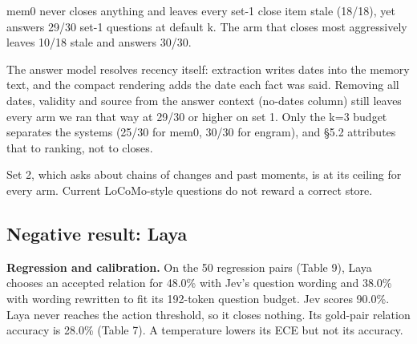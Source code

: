\documentclass[11pt]{article}
\newcommand{\src}[1]{}
\begin{document}
mem0 never closes anything and leaves every set-1 close item stale (18/18\src{bench/results/mem0__dev_updates.json}), yet answers 29/30\src{bench/results/mem0__dev_updates.json} set-1 questions at default k. The arm that closes most aggressively leaves 10/18\src{bench/results/e2_jev_v2__dev_updates__k3.json} stale and answers 30/30\src{bench/results/e2_jev_v2__dev_updates__k3.json}.

The answer model resolves recency itself: extraction writes dates into the memory text, and the compact rendering adds the date each fact was said. Removing all dates, validity and source from the answer context (no-dates column) still leaves every arm we ran that way at 29/30\src{bench/results/mem0__dev_updates__nodates.json} or higher on set 1. Only the k=3 budget separates the systems (25/30\src{bench/results/mem0__dev_updates__k3.json} for mem0, 30/30\src{bench/results/e2_jev_v2__dev_updates__k3.json} for engram), and \S{}5.2 attributes that to ranking, not to closes.

Set 2, which asks about chains of changes and past moments, is at its ceiling for every arm. Current LoCoMo-style questions do not reward a correct store.

\subsection{Negative result: Laya}
\textbf{Regression and calibration.} On the 50\src{bench/results/tradeoff.json} regression pairs (Table 9), Laya chooses an accepted relation for 48.0\%\src{bench/results/laya_regression_jev_wording.json} with Jev's question wording and 38.0\%\src{bench/results/laya_regression_native.json} with wording rewritten to fit its 192\src{bench/results/e4_belief_v2_laya__dev_updates__k3.json}-token question budget. Jev scores 90.0\%\src{bench/results/jev_regression_v2.json}. Laya never reaches the action threshold, so it closes nothing. Its gold-pair relation accuracy is 28.0\%\src{bench/results/calibration.json} (Table 7). A temperature lowers its ECE but not its accuracy.
\end{document}
